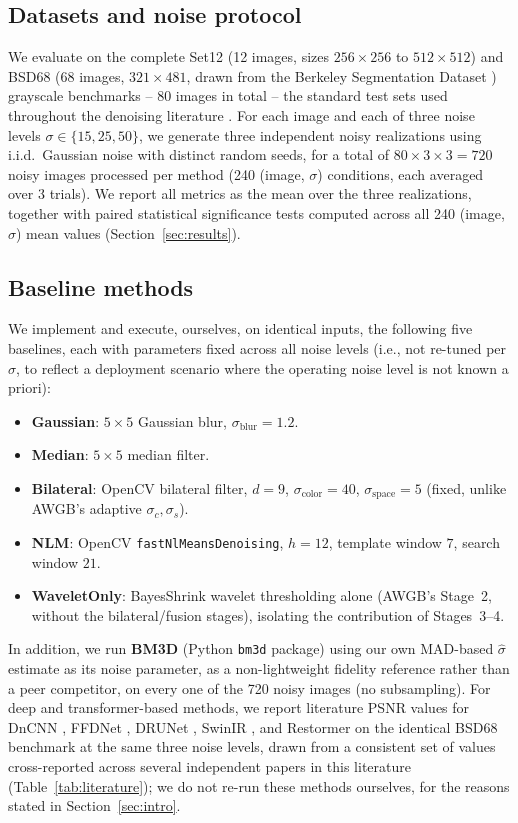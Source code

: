 \documentclass[final,3p,times,twocolumn,nopreprintline]{elsarticle}
\begin{document}
\subsection{Datasets and noise protocol}
We evaluate on the complete Set12 (12 images, sizes $256\times256$ to $512\times512$) and BSD68 (68 images, $321\times481$, drawn from the Berkeley Segmentation Dataset \cite{martin2001database}) grayscale benchmarks -- 80 images in total -- the standard test sets used throughout the denoising literature \cite{zhang2017beyond,zhang2018ffdnet,dabov2007image,zamir2022restormer}. For each image and each of three noise levels $\sigma \in \{15, 25, 50\}$, we generate three independent noisy realizations using i.i.d.\ Gaussian noise with distinct random seeds, for a total of $80 \times 3 \times 3 = 720$ noisy images processed per method (240 (image, $\sigma$) conditions, each averaged over 3 trials). We report all metrics as the mean over the three realizations, together with paired statistical significance tests computed across all 240 (image, $\sigma$) mean values (Section~\ref{sec:results}).

\subsection{Baseline methods}
We implement and execute, ourselves, on identical inputs, the following five baselines, each with parameters fixed across all noise levels (i.e., not re-tuned per $\sigma$, to reflect a deployment scenario where the operating noise level is not known a priori):
\begin{itemize}
    \item \textbf{Gaussian}: $5\times5$ Gaussian blur, $\sigma_{\text{blur}}=1.2$.
    \item \textbf{Median}: $5\times5$ median filter.
    \item \textbf{Bilateral}: OpenCV bilateral filter, $d=9$, $\sigma_{\text{color}}=40$, $\sigma_{\text{space}}=5$ (fixed, unlike AWGB's adaptive $\sigma_c,\sigma_s$).
    \item \textbf{NLM}: OpenCV \texttt{fastNlMeansDenoising}, $h=12$, template window $7$, search window $21$.
    \item \textbf{WaveletOnly}: BayesShrink wavelet thresholding alone (AWGB's Stage~2, without the bilateral/fusion stages), isolating the contribution of Stages~3--4.
\end{itemize}
In addition, we run \textbf{BM3D} \cite{dabov2007image} (Python \texttt{bm3d} package) using our own MAD-based $\hat\sigma$ estimate as its noise parameter, as a non-lightweight fidelity reference rather than a peer competitor, on every one of the 720 noisy images (no subsampling). For deep and transformer-based methods, we report literature PSNR values for DnCNN \cite{zhang2017beyond}, FFDNet \cite{zhang2018ffdnet}, DRUNet \cite{zhang2021plug}, SwinIR \cite{liang2021swinir}, and Restormer \cite{zamir2022restormer} on the identical BSD68 benchmark at the same three noise levels, drawn from a consistent set of values cross-reported across several independent papers in this literature \cite{zhang2024xformer} (Table~\ref{tab:literature}); we do not re-run these methods ourselves, for the reasons stated in Section~\ref{sec:intro}.
\end{document}

